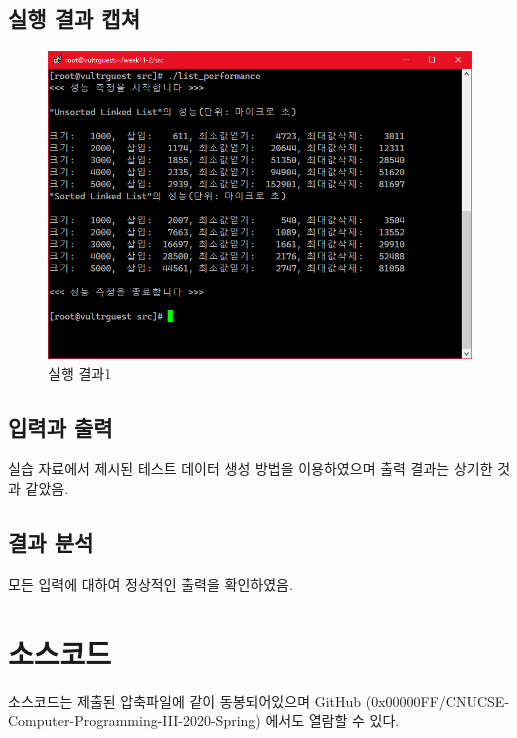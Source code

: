 \documentclass[UTF8, a4paper]{report}
\begin{document}
        \section{실행 결과 캡쳐}
        \begin{figure}[!htb]
            \centering
            \includegraphics[width=\textwidth]{result.PNG}
            \caption{실행 결과1}
        \end{figure}
        
        \newpage

        \section{입력과 출력}
            실습 자료에서 제시된 테스트 데이터 생성 방법을 이용하였으며 출력 결과는 상기한 것과 같았음.
        \section{결과 분석}
            모든 입력에 대하여 정상적인 출력을 확인하였음.

    \chapter{소스코드}
        소스코드는 제출된 압축파일에 같이 동봉되어있으며 GitHub (0x00000FF/CNUCSE-Computer-Programming-III-2020-Spring) 에서도 열람할 수 있다.
\end{document}

